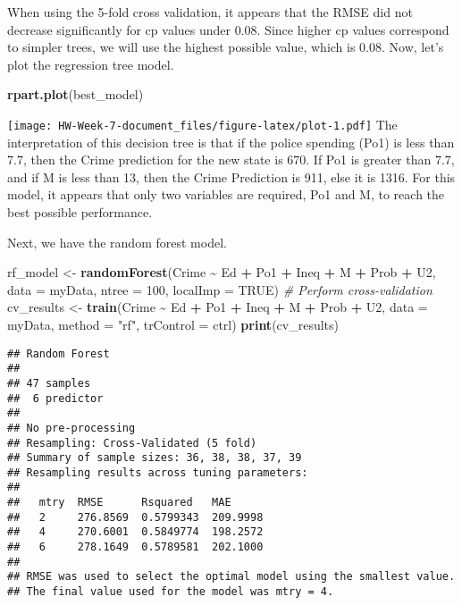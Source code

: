 \documentclass[
]{article}
\newenvironment{Shaded}{\begin{snugshade}}{\end{snugshade}}
\newcommand{\AttributeTok}[1]{\textcolor[rgb]{0.13,0.29,0.53}{#1}}
\newcommand{\CommentTok}[1]{\textcolor[rgb]{0.56,0.35,0.01}{\textit{#1}}}
\newcommand{\ConstantTok}[1]{\textcolor[rgb]{0.56,0.35,0.01}{#1}}
\newcommand{\DecValTok}[1]{\textcolor[rgb]{0.00,0.00,0.81}{#1}}
\newcommand{\FunctionTok}[1]{\textcolor[rgb]{0.13,0.29,0.53}{\textbf{#1}}}
\newcommand{\NormalTok}[1]{#1}
\newcommand{\OtherTok}[1]{\textcolor[rgb]{0.56,0.35,0.01}{#1}}
\newcommand{\SpecialCharTok}[1]{\textcolor[rgb]{0.81,0.36,0.00}{\textbf{#1}}}
\newcommand{\StringTok}[1]{\textcolor[rgb]{0.31,0.60,0.02}{#1}}
\begin{document}
When using the 5-fold cross validation, it appears that the RMSE did not
decrease significantly for cp values under 0.08. Since higher cp values
correspond to simpler trees, we will use the highest possible value,
which is 0.08. Now, let's plot the regression tree model.

\begin{Shaded}
\begin{Highlighting}[]
\FunctionTok{rpart.plot}\NormalTok{(best\_model)}
\end{Highlighting}
\end{Shaded}

\texttt{[image: HW-Week-7-document\_files/figure-latex/plot-1.pdf]} The
interpretation of this decision tree is that if the police spending
(Po1) is less than 7.7, then the Crime prediction for the new state is
670. If Po1 is greater than 7.7, and if M is less than 13, then the
Crime Prediction is 911, else it is 1316. For this model, it appears
that only two variables are required, Po1 and M, to reach the best
possible performance.

Next, we have the random forest model.

\begin{Shaded}
\begin{Highlighting}[]
\NormalTok{rf\_model }\OtherTok{\textless{}{-}} \FunctionTok{randomForest}\NormalTok{(Crime }\SpecialCharTok{\textasciitilde{}}\NormalTok{ Ed }\SpecialCharTok{+}\NormalTok{ Po1 }\SpecialCharTok{+}\NormalTok{ Ineq }\SpecialCharTok{+}\NormalTok{ M }\SpecialCharTok{+}\NormalTok{ Prob }\SpecialCharTok{+}\NormalTok{ U2, }\AttributeTok{data =}\NormalTok{ myData, }\AttributeTok{ntree =} \DecValTok{100}\NormalTok{, }\AttributeTok{localImp =} \ConstantTok{TRUE}\NormalTok{)}
\CommentTok{\# Perform cross{-}validation}
\NormalTok{cv\_results }\OtherTok{\textless{}{-}} \FunctionTok{train}\NormalTok{(Crime }\SpecialCharTok{\textasciitilde{}}\NormalTok{ Ed }\SpecialCharTok{+}\NormalTok{ Po1 }\SpecialCharTok{+}\NormalTok{ Ineq }\SpecialCharTok{+}\NormalTok{ M }\SpecialCharTok{+}\NormalTok{ Prob }\SpecialCharTok{+}\NormalTok{ U2, }\AttributeTok{data =}\NormalTok{ myData, }\AttributeTok{method =} \StringTok{"rf"}\NormalTok{, }\AttributeTok{trControl =}\NormalTok{ ctrl)}
\FunctionTok{print}\NormalTok{(cv\_results)}
\end{Highlighting}
\end{Shaded}

\begin{verbatim}
## Random Forest 
## 
## 47 samples
##  6 predictor
## 
## No pre-processing
## Resampling: Cross-Validated (5 fold) 
## Summary of sample sizes: 36, 38, 38, 37, 39 
## Resampling results across tuning parameters:
## 
##   mtry  RMSE      Rsquared   MAE     
##   2     276.8569  0.5799343  209.9998
##   4     270.6001  0.5849774  198.2572
##   6     278.1649  0.5789581  202.1000
## 
## RMSE was used to select the optimal model using the smallest value.
## The final value used for the model was mtry = 4.
\end{verbatim}
\end{document}
